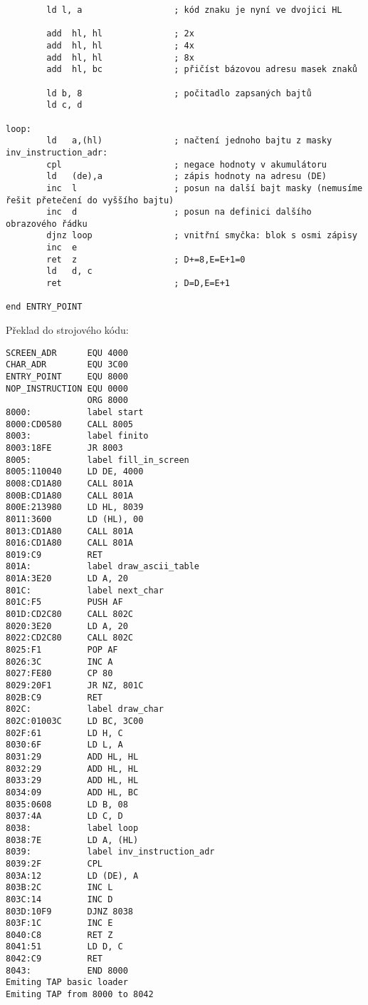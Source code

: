 \documentclass{article}
\begin{document}
\begin{verbatim}
        ld l, a                  ; kód znaku je nyní ve dvojici HL
 
        add  hl, hl              ; 2x
        add  hl, hl              ; 4x
        add  hl, hl              ; 8x
        add  hl, bc              ; přičíst bázovou adresu masek znaků
 
        ld b, 8                  ; počitadlo zapsaných bajtů
        ld c, d
 
loop:
        ld   a,(hl)              ; načtení jednoho bajtu z masky
inv_instruction_adr:
        cpl                      ; negace hodnoty v akumulátoru
        ld   (de),a              ; zápis hodnoty na adresu (DE)
        inc  l                   ; posun na další bajt masky (nemusíme řešit přetečení do vyššího bajtu)
        inc  d                   ; posun na definici dalšího obrazového řádku
        djnz loop                ; vnitřní smyčka: blok s osmi zápisy
        inc  e
        ret  z                   ; D+=8,E=E+1=0
        ld   d, c
        ret                      ; D=D,E=E+1
 
end ENTRY_POINT
\end{verbatim}

Překlad do strojového kódu:

\begin{verbatim}
SCREEN_ADR      EQU 4000
CHAR_ADR        EQU 3C00
ENTRY_POINT     EQU 8000
NOP_INSTRUCTION EQU 0000
                ORG 8000
8000:           label start
8000:CD0580     CALL 8005
8003:           label finito
8003:18FE       JR 8003
8005:           label fill_in_screen
8005:110040     LD DE, 4000
8008:CD1A80     CALL 801A
800B:CD1A80     CALL 801A
800E:213980     LD HL, 8039
8011:3600       LD (HL), 00
8013:CD1A80     CALL 801A
8016:CD1A80     CALL 801A
8019:C9         RET
801A:           label draw_ascii_table
801A:3E20       LD A, 20
801C:           label next_char
801C:F5         PUSH AF
801D:CD2C80     CALL 802C
8020:3E20       LD A, 20
8022:CD2C80     CALL 802C
8025:F1         POP AF
8026:3C         INC A
8027:FE80       CP 80
8029:20F1       JR NZ, 801C
802B:C9         RET
802C:           label draw_char
802C:01003C     LD BC, 3C00
802F:61         LD H, C
8030:6F         LD L, A
8031:29         ADD HL, HL
8032:29         ADD HL, HL
8033:29         ADD HL, HL
8034:09         ADD HL, BC
8035:0608       LD B, 08
8037:4A         LD C, D
8038:           label loop
8038:7E         LD A, (HL)
8039:           label inv_instruction_adr
8039:2F         CPL
803A:12         LD (DE), A
803B:2C         INC L
803C:14         INC D
803D:10F9       DJNZ 8038
803F:1C         INC E
8040:C8         RET Z
8041:51         LD D, C
8042:C9         RET
8043:           END 8000
Emiting TAP basic loader
Emiting TAP from 8000 to 8042
\end{verbatim}
\end{document}
